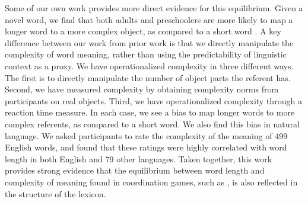 \documentclass[man, noapacite, 12pt]{apa2}
\begin{document}
Some of our own work provides more direct evidence for this equilibrium. Given a novel word, we find that both adults and preschoolers are more likely to map a longer word to a more complex object, as compared to a short word \cite{lewis2014structure}. A key difference between our work from prior work is that we  directly manipulate the complexity of word meaning, rather than using the predictability of linguistic context as a proxy. We have operationalized complexity in three different ways. The first is to directly manipulate the number of object parts the referent has. Second, we have measured complexity by obtaining complexity norms from participants on real objects. Third, we have operationalized complexity through a reaction time measure. In each case, we see a bias to map longer words to more complex referents, as compared to a short word. We also find this bias in natural language. We asked participants to rate the complexity of the meaning  of 499 English words, and found that these ratings were highly correlated with word length in both English and 79 other languages. Taken together, this work provides strong evidence that the equilibrium between word length and complexity of meaning found in coordination games, such as , is also reflected in the structure of the lexicon. 
\end{document}
